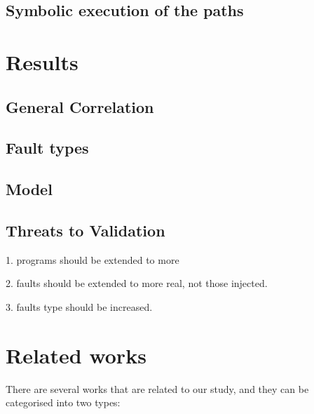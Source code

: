 \documentclass{sig-alternate-05-2015}
\begin{document}
\subsection{Symbolic execution of the paths}



\section{Results}\label{sec:results}

\subsection{General Correlation}

\subsection{Fault types}

\subsection{Model }


\subsection{Threats to Validation}


1. programs should be extended to more

2. faults should be extended to more real, not those injected.

3. faults type should be increased.

\section{Related works}\label{sec:related}

There are several works that are related to our study, and they can be categorised into two types:
\end{document}
